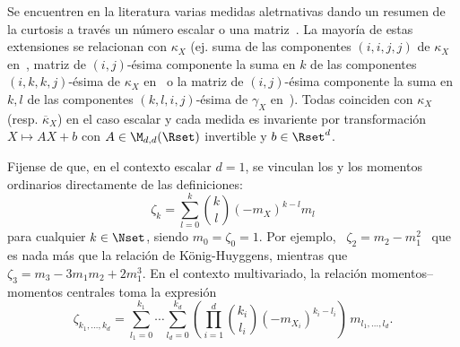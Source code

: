\begin{itemize}
\begin{enumerate}
{\[  \]
  Se encuentren en la literatura varias medidas aletrnativas dando un resumen de
  la curtosis a trav\'es un n\'umero escalar o una matriz~\cite{Mar70, MalAfi73,
    Sri84,  MorRoh94,  Kol08, Seb04}.   La  mayor\'ia  de  estas extensiones  se
  relacionan  con  $\kappa_X$  (ej.  suma  de  las  componentes  $(i,i,j,j)$  de
  $\kappa_X$ en~\cite{Mar70},  matriz de  $(i,j)$-\'esima componente la  suma en
  $k$ de las componentes  $(i,k,k,j)$-\'esima de $\kappa_X$ en~\cite{MorRho94} o
  la matriz  de $(i,j)$-\'esima componente la  suma en $k,l$  de las componentes
  $(k,l,i,j)$-\'esima  de  $\gamma_X$  en~\cite{Kol08}).   Todas  coinciden  con
  $\kappa_X$ (resp. $\overline{\kappa}_X$)  en el caso escalar y  cada medida es
  invariente   por  transformaci\'on  $X   \mapsto  A   X  +   b$  con   $A  \in
  \M_{d,d}(\Rset)$ invertible y $b \in \Rset^d$.}
  \end{enumerate}
  Fijense  de   que,  en  el  contexto   escalar  $d  =  1$,   se  vinculan  los
    y los  momentos  ordinarios  directamente de  las
  definiciones:
  \[
  \zeta_k = \sum_{l=0}^k \binom{k}{l} \left( - m_X \right)^{k-l} m_l
  \]
  para cualquier  $k \in  \Nset$, siendo $m_0  = \zeta_0  = 1$.  Por  ejemplo, \
  $\zeta_2  =  m_2  -  m_1^2$  \   que  es  nada  m\'as  que  la  relaci\'on  de
  K\"onig-Huyggens, mientras que \ $\zeta_3 = m_3 - 3 m_1 m_2 + 2 m_1^3$.  En el
  contexto  multivariado,  la relaci\'on  momentos--momentos  centrales toma  la
  expresi\'on
  \[
  \zeta_{k_1,\ldots,k_d}  = \sum_{l_1  =  0}^{k_1} \cdots  \sum_{l_d =  0}^{k_d}
  \left(  \prod_{i=1}^d  \binom{k_i}{l_i}  \left(  -  m_{X_i}  \right)^{k_i-l_i}
  \right) \, m_{l_1,\ldots,l_d}.
  \]
\end{itemize}


